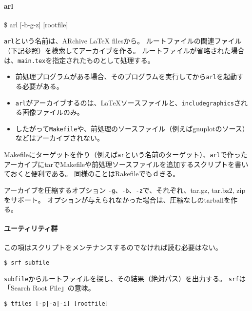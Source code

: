 \hypertarget{arl}{%
\paragraph{arl}\label{arl}}

\$ arl {[}-b\textbar{}-g\textbar{}-z{]} {[}rootfile{]}

\texttt{arl}という名前は、ARchive LaTeX filesから。
ルートファイルの関連ファイル（下記参照）を検索してアーカイブを作る。
ルートファイルが省略された場合は、\texttt{main.tex}を指定されたものとして処理する。

\begin{itemize}
\tightlist
\item
  前処理プログラムがある場合、そのプログラムを実行してから\texttt{arl}を起動する必要がある。
\item
  \texttt{arl}がアーカイブするのは、LaTeXソースファイルと、\texttt{includegraphics}される画像ファイルのみ。
\item
  したがって\texttt{Makefile}や、前処理のソースファイル（例えばgnuplotのソース）などはアーカイブされない。
\end{itemize}

Makefileにターゲットを作り（例えば\texttt{ar}という名前のターゲット）、\texttt{arl}で作ったアーカイブにtarでMakefileや前処理ソースファイルを追加するスクリプトを書いておくと便利である。
同様のことはRakefileでもｄきる。

アーカイブを圧縮するオプション
\texttt{-g}、\texttt{-b}、\texttt{-z}で、それぞれ、tar.gz, tar.bz2,
zipをサポート。
オプションが与えられなかった場合は、圧縮なしのtarballを作る。

\hypertarget{ux30e6ux30fcux30c6ux30a3ux30eaux30c6ux30a3ux7fa4}{%
\paragraph{ユーティリティ群}\label{ux30e6ux30fcux30c6ux30a3ux30eaux30c6ux30a3ux7fa4}}

この項はスクリプトをメンテナンスするのでなければ読む必要はない。

\begin{verbatim}
$ srf subfile
\end{verbatim}

\texttt{subfile}からルートファイルを探し、その結果（絶対パス）を出力する。
\texttt{srf}は「Search Root File」の意味。

\begin{verbatim}
$ tfiles [-p|-a|-i] [rootfile]
\end{verbatim}

